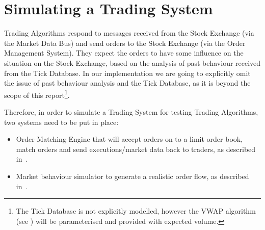 \section{Simulating a Trading System}
Trading Algorithms respond to messages received from the Stock Exchange (via the Market Data Bus) and send orders to the Stock Exchange (via the Order Management System). They expect the orders to have some influence on the situation on the Stock Exchange, based on the analysis of past behaviour received from the Tick Database. In our implementation we are going to explicitly omit the issue of past behaviour analysis and the Tick Database, as it is beyond the scope of this report\footnote{The Tick Database is not explicitly modelled, however the VWAP algorithm (see ) will be parameterised and provided with expected volume.}. 

Therefore, in order to simulate a Trading System for testing Trading Algorithms, two systems need to be put in place:
\begin{itemize}
\item Order Matching Engine that will accept orders on to a limit order book, match orders and send executions/market data back to traders, as described in~.
\item Market behaviour simulator to generate a realistic order flow, as described in~. 
\end{itemize}
